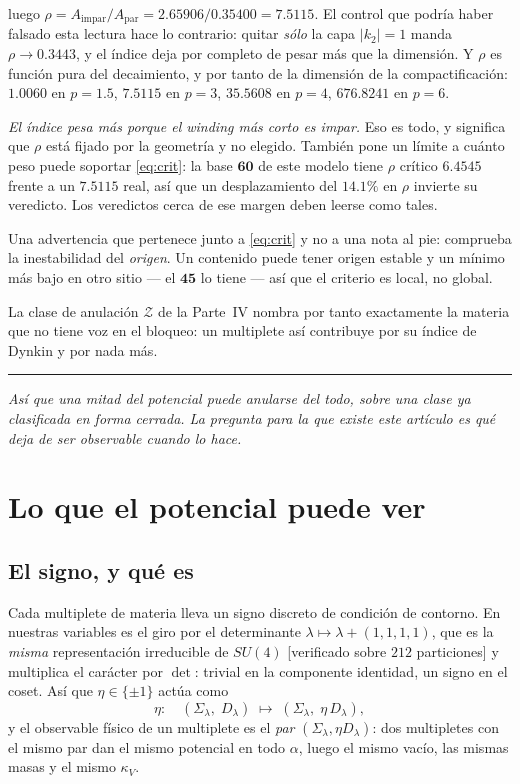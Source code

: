 \documentclass[11pt,a4paper]{article}
\newcommand{\su}[1]{SU(#1)}
\newcommand{\Sig}{\Sigma_\lambda}
\newcommand{\Dl}{D_\lambda}
\newcommand{\bridge}[1]{\par\medskip\noindent
  \textcolor{hdrblue!45}{\rule{2.2cm}{0.6pt}}\;\;\parbox[t]{0.84\textwidth}{\small\itshape
  \textcolor{hdrblue!85}{#1}}\par\medskip}
\begin{document}
\noindent luego $\rho=A_{\mathrm{impar}}/A_{\mathrm{par}}=2.65906/0.35400=7.5115$. El control que
podría haber falsado esta lectura hace lo contrario: quitar \emph{sólo} la capa $|k_2|=1$ manda
$\rho\to0.3443$, y el índice deja por completo de pesar más que la dimensión. Y $\rho$ es función
pura del decaimiento, y por tanto de la dimensión de la compactificación: $1.0060$ en $p=1.5$,
$7.5115$ en $p=3$, $35.5608$ en $p=4$, $676.8241$ en $p=6$.

\emph{El índice pesa más porque el winding más corto es impar.} Eso es todo, y significa que $\rho$
está fijado por la geometría y no elegido. También pone un límite a cuánto peso puede soportar
\eqref{eq:crit}: la base $\mathbf{60}$ de este modelo tiene $\rho$ crítico $6.4545$ frente a un
$7.5115$ real, así que un desplazamiento del $14.1\%$ en $\rho$ invierte su veredicto. Los veredictos
cerca de ese margen deben leerse como tales.

\medskip
Una advertencia que pertenece junto a \eqref{eq:crit} y no a una nota al pie: comprueba la
inestabilidad del \emph{origen}. Un contenido puede tener origen estable y un mínimo más bajo en otro
sitio --- el $\mathbf{45}$ lo tiene --- así que el criterio es local, no global.

La clase de anulación $\mathcal Z$ de la Parte~IV nombra por tanto exactamente la materia que no
tiene voz en el bloqueo: un multiplete así contribuye por su índice de Dynkin y por nada más.

\bridge{Así que una mitad del potencial puede anularse del todo, sobre una clase ya clasificada en
forma cerrada. La pregunta para la que existe este artículo es qué deja de ser observable cuando lo
hace.}

\section{Lo que el potencial puede ver}\label{sec:obs}

\subsection*{El signo, y qué es}

Cada multiplete de materia lleva un signo discreto de condición de contorno. En nuestras variables es
el giro por el determinante $\lambda\mapsto\lambda+(1,1,1,1)$, que es la \emph{misma} representación
irreducible de $\su4$ [verificado sobre $212$ particiones] y multiplica el carácter por $\det$:
trivial en la componente identidad, un signo en el coset. Así que $\eta\in\{\pm1\}$ actúa como
\begin{equation}\label{eq:etaact}
\eta:\quad (\Sig,\;\Dl)\;\longmapsto\;(\Sig,\;\eta\,\Dl),
\end{equation}
y el observable físico de un multiplete es el \emph{par} $(\Sig,\eta\Dl)$: dos multipletes con el
mismo par dan el mismo potencial en todo $\alpha$, luego el mismo vacío, las mismas masas y el mismo
$\kappa_V$.
\end{document}
